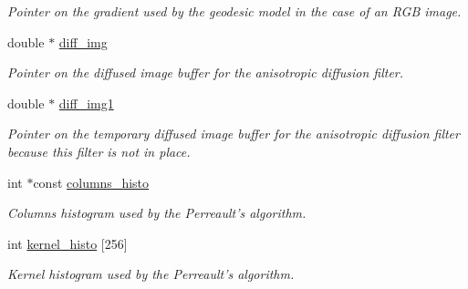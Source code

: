 \begin{DoxyCompactItemize}
\begin{DoxyCompactList}\small\item\em Pointer on the gradient used by the geodesic model in the case of an R\-G\-B image. \end{DoxyCompactList}\item 
\hypertarget{classofeli_1_1_filters_ab7294c70e210d8300f8fab04f6d8a734}{double $\ast$ \hyperlink{classofeli_1_1_filters_ab7294c70e210d8300f8fab04f6d8a734}{diff\-\_\-img}}\label{classofeli_1_1_filters_ab7294c70e210d8300f8fab04f6d8a734}

\begin{DoxyCompactList}\small\item\em Pointer on the diffused image buffer for the anisotropic diffusion filter. \end{DoxyCompactList}\item 
\hypertarget{classofeli_1_1_filters_af81a398844127108ad6a2742f8079b8d}{double $\ast$ \hyperlink{classofeli_1_1_filters_af81a398844127108ad6a2742f8079b8d}{diff\-\_\-img1}}\label{classofeli_1_1_filters_af81a398844127108ad6a2742f8079b8d}

\begin{DoxyCompactList}\small\item\em Pointer on the temporary diffused image buffer for the anisotropic diffusion filter because this filter is not in place. \end{DoxyCompactList}\item 
\hypertarget{classofeli_1_1_filters_a0c4833447639123fc17033fa375d0b8b}{int $\ast$const \hyperlink{classofeli_1_1_filters_a0c4833447639123fc17033fa375d0b8b}{columns\-\_\-histo}}\label{classofeli_1_1_filters_a0c4833447639123fc17033fa375d0b8b}

\begin{DoxyCompactList}\small\item\em Columns histogram used by the Perreault's algorithm. \end{DoxyCompactList}\item 
\hypertarget{classofeli_1_1_filters_aa48e946134f25fa04373cfd149f1ea0f}{int \hyperlink{classofeli_1_1_filters_aa48e946134f25fa04373cfd149f1ea0f}{kernel\-\_\-histo} \mbox{[}256\mbox{]}}\label{classofeli_1_1_filters_aa48e946134f25fa04373cfd149f1ea0f}

\begin{DoxyCompactList}\small\item\em Kernel histogram used by the Perreault's algorithm. \end{DoxyCompactList}\end{DoxyCompactItemize}


